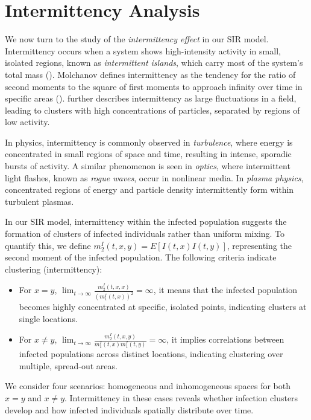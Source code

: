 \documentclass[sn-basic]{sn-jnl}%
\theoremstyle{thmstyleone}%
\theoremstyle{thmstyletwo}%
\theoremstyle{thmstylethree}%
\numberwithin{equation}{theorem}
\begin{document}
\section{Intermittency Analysis}

We now turn to the study of the \textit{intermittency effect} in our SIR model. Intermittency occurs when a system shows high-intensity activity in small, isolated regions, known as \textit{intermittent islands}, which carry most of the system’s total mass (\citep{carmona1994parabolic,8,konig2016parabolic}). Molchanov defines intermittency as the tendency for the ratio of second moments to the square of first moments to approach infinity over time in specific areas (\citep{8}). \citep{konig2016parabolic} further describes intermittency as large fluctuations in a field, leading to clusters with high concentrations of particles, separated by regions of low activity.

In physics, intermittency is commonly observed in \textit{turbulence}, where energy is concentrated in small regions of space and time, resulting in intense, sporadic bursts of activity. A similar phenomenon is seen in \textit{optics}, where intermittent light flashes, known as \textit{rogue waves}, occur in nonlinear media. In \textit{plasma physics}, concentrated regions of energy and particle density intermittently form within turbulent plasmas.

In our SIR model, intermittency within the infected population suggests the formation of clusters of infected individuals rather than uniform mixing. To quantify this, we define $m_2^I(t,x,y) = E[I(t,x)I(t,y)]$, representing the second moment of the infected population. The following criteria indicate clustering (intermittency):
\begin{itemize}
    \item For $x = y$, $\lim_{t \rightarrow \infty} \frac{m_2^I(t,x,x)}{(m_1^I(t,x))^2} = \infty$,  it means that the infected population becomes highly concentrated at specific, isolated points, indicating clusters at single locations.
    \item For $x \neq y$, $\lim_{t \rightarrow \infty} \frac{m_2^I(t,x,y)}{m_1^I(t,x)m_1^I(t,y)} = \infty$, it implies correlations between infected populations across distinct locations, indicating clustering over multiple, spread-out areas.
\end{itemize}

We consider four scenarios: homogeneous and inhomogeneous spaces for both $x = y$ and $x \neq y$. Intermittency in these cases reveals whether infection clusters develop and how infected individuals spatially distribute over time.
\end{document}
